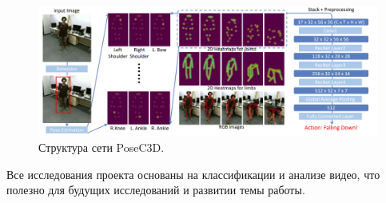 \begin{figure}[h]
	\centering
	\includegraphics[width=\textwidth]{./images/Classificators/PoseC3D}
	\caption{Структура сети PoseC3D. \cite{duan2021revisiting}}
	\label{fig:posec3d}
\end{figure}

Все исследования проекта основаны на классификации и анализе видео, что полезно для будущих исследований и развитии темы работы.


\newpage
